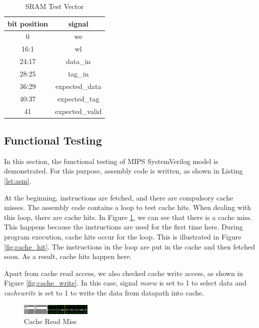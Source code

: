 \documentclass[conference]{IEEEtran}
\begin{document}
\begin{itemize}
\begin{table}[h]
\centering
\caption{SRAM Test Vector}
\label{table:sram}
\begin{tabular}{c|c}
  \hline
  \textbf{bit position} & \textbf{signal}\\  
  \hline
  0 & we\\
  16:1 & wl \\
  24:17 & data\_in\\
  28:25 & tag\_in\\
  36:29 & expected\_data\\
  40:37 & expected\_tag\\
  41 & expected\_valid\\
  \hline
\end{tabular}
\end{table}

\end{itemize}

\subsection{Functional Testing}\label{subsec:func_test}
In this section, the functional testing of MIPS SystemVerilog model is
demonstrated. For this purpose, assembly code is written, as shown in Listing
\ref{lst:asm}.


At the beginning, instructions are fetched, and there are compulsory cache misses. The assembly code contains a loop to test cache hits. When dealing with this loop, there are cache hits. In Figure \ref{fig:cache_miss}, we can see that there is a cache miss. This happens because the instructions are used for the first time here. During program execution, cache hits occur for the loop. This is illustrated in Figure \ref{fig:cache_hit}. The instructions in the loop are put in the cache and then fetched soon. As a result, cache hits happen here.

Apart from cache read access, we also checked cache write access, as shown in Figure \ref{fig:cache_write}. In this case, signal \textit{morw} is set to 1 to select data and \textit{cachewrite} is set to 1 to write the data from datapath into cache.

\begin{figure}[h!]
  \centering
    \includegraphics[width=0.3\textwidth]{cache_miss.png}
  \caption{Cache Read Miss}
  \label{fig:cache_miss}
\end{figure}
\end{document}

